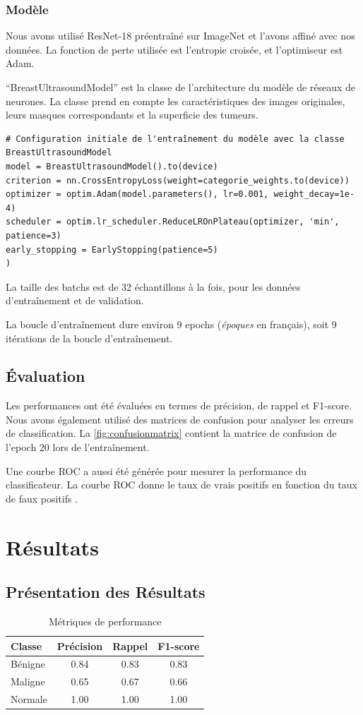 \documentclass[a4paper,12pt]{article}
\begin{document}
\subsubsection{Modèle}
Nous avons utilisé ResNet-18 préentraîné sur ImageNet et l'avons affiné avec nos données. La fonction de perte utilisée est l'entropie croisée, et l'optimiseur est Adam.

\enquote{BreastUltrasoundModel} est la classe de l'architecture du modèle de réseaux de neurones. La classe prend en compte les caractéristiques des images originales, leurs masques correspondants et la superficie des tumeurs.

\begin{verbatim}
# Configuration initiale de l'entraînement du modèle avec la classe BreastUltrasoundModel
model = BreastUltrasoundModel().to(device)
criterion = nn.CrossEntropyLoss(weight=categorie_weights.to(device))
optimizer = optim.Adam(model.parameters(), lr=0.001, weight_decay=1e-4)
scheduler = optim.lr_scheduler.ReduceLROnPlateau(optimizer, 'min', patience=3)
early_stopping = EarlyStopping(patience=5)
)
\end{verbatim}

La taille des batchs est de 32 échantillons à la fois, pour les données d'entraînement et de validation.

La boucle d'entraînement dure environ 9 epochs (\textit{époques} en français), soit 9 itérations de la boucle d'entraînement.

\subsection{Évaluation}
Les performances ont été évaluées en termes de précision, de rappel et F1-score. Nous avons également utilisé des matrices de confusion pour analyser les erreurs de classification. La \autoref{fig:confusionmatrix} contient la matrice de confusion de l'epoch 20 lors de l'entraînement.

Une courbe ROC a aussi été générée pour mesurer la performance du classificateur. La courbe ROC donne le taux de vrais positifs en fonction du taux de faux positifs \cite{frwiki:224482682}.

\section{Résultats}

\subsection{Présentation des Résultats}
\begin{table}[h]
\centering
\caption{Métriques de performance}
\begin{tabular}{lccc}
\toprule
Classe & Précision & Rappel & F1-score \\
\midrule
Bénigne & 0.84 & 0.83 & 0.83 \\
Maligne & 0.65 & 0.67 & 0.66 \\
Normale & 1.00 & 1.00 & 1.00 \\
\bottomrule
\end{tabular}
\end{table}
\end{document}
